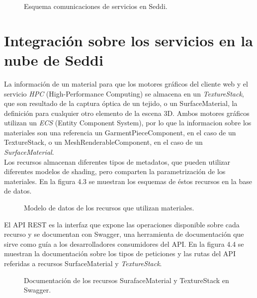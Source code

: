   \begin{figure}[H]
    \vspace{1cm}
    \centering
    \caption{Esquema comunicaciones de servicios en Seddi.}
    \vspace{1.5cm}
  \end{figure}

\egroup

\section{Integraci\'on sobre los servicios en la nube de Seddi}
La informaci\'on de un material para que los motores gr\'aficos del cliente web y el servicio \textit{HPC} (High-Performance Computing)
se almacena en un \textit{TextureStack}, que son resultado de la captura \'optica de un tejido, o un SurfaceMaterial, la definici\'on para
cualquier otro elemento de la escena 3D. Ambos motores gr\'aficos utilizan un \textit{ECS} (Entity Component System), por lo que
la informacion sobre los materiales son una referencia un GarmentPieceComponent, en el caso de un TextureStack,
o un MeshRenderableComponent, en el caso de un \textit{SurfaceMaterial}.\\
Los recursos almacenan diferentes tipos de metadatos, que pueden utilizar diferentes modelos de shading, pero
comparten la parametrizaci\'on de los materiales. En la figura 4.3 se muestran los esquemas de \'estos recursos en la
base de datos.\\

\begin{figure}[H]
  \vspace{0.5cm}
  \centering
  \caption{Modelo de datos de los recursos que utilizan materiales.}
  \vspace{0.5cm}
\end{figure}


El API REST es la interfaz que expone las operaciones disponible sobre cada recurso y se documentan con Swagger,
una herramienta de documentaci\'on que sirve como gu\'ia a los desarrolladores consumidores del API. En
la figura 4.4 se muestran la documentaci\'on sobre los tipos de peticiones y las rutas del API referidas a recursos
SurfaceMaterial y \textit{TextureStack}.\\

\begin{figure}[H]
  \vspace{0.5cm}
  \centering
  \caption{Documentaci\'on de los recursos SurafaceMaterial y TextureStack en Swagger.}
  \vspace{0.5cm}
\end{figure}


